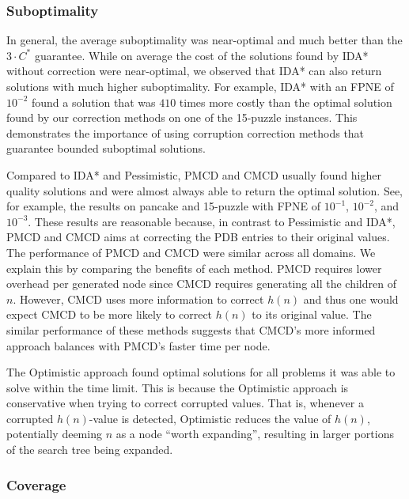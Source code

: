 \documentclass[letterpaper]{article}
\begin{document}
\subsubsection{Suboptimality}
In general, the average suboptimality was near-optimal and much better than the $3\cdot C^*$ guarantee. While on average the cost of the solutions found by IDA* without correction were near-optimal, we observed that IDA* can also return solutions with much higher suboptimality. For example, IDA* with an FPNE of $10^{-2}$ found a solution that was $410$ times more costly than %
the optimal solution found by our correction methods
on one of the 15-puzzle instances.
This demonstrates the importance of using corruption correction methods that guarantee bounded suboptimal solutions.

Compared to IDA* and Pessimistic, PMCD and CMCD usually found higher quality solutions  and were almost always able to return the optimal solution. See, for example, the results on pancake and 15-puzzle with FPNE of $10^{-1}$, $10^{-2}$, and $10^{-3}$. These results are reasonable because, in contrast to Pessimistic and IDA*, PMCD and CMCD aims at correcting the PDB entries to their original values. %
The performance of PMCD and CMCD were similar across all domains. We explain this by comparing the benefits of each method. PMCD requires lower overhead per generated node since CMCD requires generating all the children of $n$. However, CMCD uses more information to correct $h(n)$ and thus one would expect CMCD to be more likely to correct $h(n)$ to its original value. The similar performance of these methods suggests that CMCD's more informed approach balances with PMCD's faster time per node.

The Optimistic approach found optimal solutions for all problems it was able to solve within the time limit. This is because the Optimistic approach is conservative when trying to correct corrupted values. That is, whenever a corrupted $h(n)$-value is detected, Optimistic reduces the value of $h(n)$, potentially deeming $n$ as a node ``worth expanding'', resulting in larger portions of the search tree being expanded.


\subsubsection{Coverage}
\end{document}
